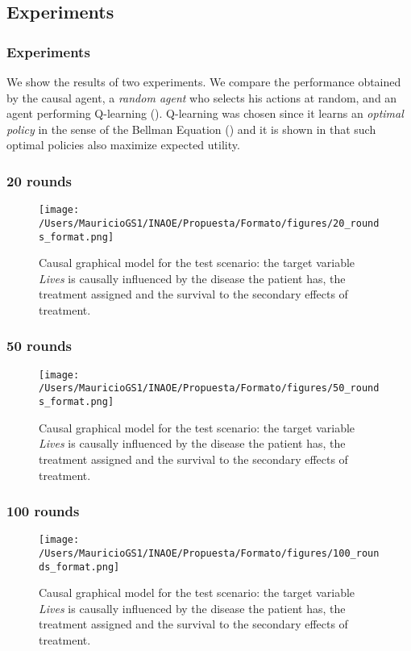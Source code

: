 \documentclass{beamer}
\theoremstyle{plain}
\begin{document}
\subsection{Experiments}
\begin{frame}
\frametitle{Experiments}
We show the results of two experiments. We compare the performance obtained by the causal agent, a \textit{random agent} who selects his actions at random, and an agent performing Q-learning (\cite{watkins1992q}). Q-learning was chosen since it learns an \textit{optimal policy} in the sense of the Bellman Equation (\cite{sutton1998reinforcement}) and it is shown in \cite{webb2007game} that such optimal policies also maximize expected utility. 
\end{frame}

\begin{frame}
\frametitle{20 rounds}
\begin{figure}[ht]
\vskip 0.2in
\begin{center}
\texttt{[image: /Users/MauricioGS1/INAOE/Propuesta/Formato/figures/20\_rounds\_format.png]}
\caption{Causal graphical model for the test scenario: the target variable \textit{Lives} is causally influenced by the disease the patient has, the treatment assigned and the survival to the secondary effects of treatment.}
\end{center}
\vskip -0.2in
\end{figure}
\end{frame}

\begin{frame}
\frametitle{50 rounds}
\begin{figure}[ht]
\vskip 0.2in
\begin{center}
\texttt{[image: /Users/MauricioGS1/INAOE/Propuesta/Formato/figures/50\_rounds\_format.png]}
\caption{Causal graphical model for the test scenario: the target variable \textit{Lives} is causally influenced by the disease the patient has, the treatment assigned and the survival to the secondary effects of treatment.}
\end{center}
\vskip -0.2in
\end{figure}
\end{frame}

\begin{frame}
\frametitle{100 rounds}
\begin{figure}[ht]
\vskip 0.2in
\begin{center}
\texttt{[image: /Users/MauricioGS1/INAOE/Propuesta/Formato/figures/100\_rounds\_format.png]}
\caption{Causal graphical model for the test scenario: the target variable \textit{Lives} is causally influenced by the disease the patient has, the treatment assigned and the survival to the secondary effects of treatment.}
\end{center}
\vskip -0.2in
\end{figure}
\end{frame}
\end{document}
